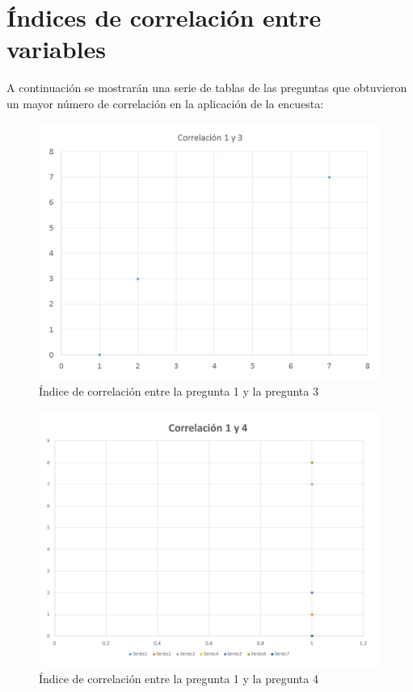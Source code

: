 \documentclass[12pt] {report}
\begin{document}
\section{Índices de correlación entre variables}
A continuación se mostrarán una serie de tablas de las preguntas que obtuvieron un mayor número de correlación en la aplicación de la encuesta:
\begin{figure}[H]
\centering 
\includegraphics[scale=.7]{correlacion13.jpg}
\caption{Índice de correlación entre la pregunta 1 y la pregunta 3}
\end{figure}
\begin{figure}[H]
\centering 
\includegraphics[scale=.7]{correlacion_14.jpg}
\caption{Índice de correlación entre la pregunta 1 y la pregunta 4}
\end{figure}
\end{document}
